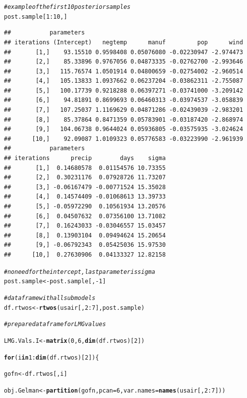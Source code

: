 \documentclass[11pt,a4paper,twoside]{book}
\makeatletter
\newcommand{\hlnum}[1]{\textcolor[rgb]{0.686,0.059,0.569}{#1}}%
\newcommand{\hlcom}[1]{\textcolor[rgb]{0.678,0.584,0.686}{\textit{#1}}}%
\newcommand{\hlopt}[1]{\textcolor[rgb]{0,0,0}{#1}}%
\newcommand{\hlstd}[1]{\textcolor[rgb]{0.345,0.345,0.345}{#1}}%
\newcommand{\hlkwa}[1]{\textcolor[rgb]{0.161,0.373,0.58}{\textbf{#1}}}%
\newcommand{\hlkwb}[1]{\textcolor[rgb]{0.69,0.353,0.396}{#1}}%
\newcommand{\hlkwc}[1]{\textcolor[rgb]{0.333,0.667,0.333}{#1}}%
\newcommand{\hlkwd}[1]{\textcolor[rgb]{0.737,0.353,0.396}{\textbf{#1}}}%
\newenvironment{kframe}{%
 \def\at@end@of@kframe{}%
 \ifinner\ifhmode%
  \def\at@end@of@kframe{\end{minipage}}%
  \begin{minipage}{\columnwidth}%
 \fi\fi%
 \def\FrameCommand##1{\hskip\@totalleftmargin \hskip-\fboxsep
 \colorbox{shadecolor}{##1}\hskip-\fboxsep
     \hskip-\linewidth \hskip-\@totalleftmargin \hskip\columnwidth}%
 \MakeFramed {\advance\hsize-\width
   \@totalleftmargin\z@ \linewidth\hsize
   \@setminipage}}%
 {\par\unskip\endMakeFramed%
 \at@end@of@kframe}
\newenvironment{knitrout}{}{} %
\makeatother
\begin{document}
\begin{knitrout}
\begin{kframe}
\begin{alltt}
\hlcom{#example of the first 10 posterior samples}
\hlstd{post.sample[}\hlnum{1}\hlopt{:}\hlnum{10}\hlstd{,]}
\end{alltt}
\begin{verbatim}
##           parameters
## iterations (Intercept)   negtemp      manuf         pop      wind
##       [1,]    93.15510 0.9598408 0.05076080 -0.02230947 -2.974473
##       [2,]    85.33896 0.9767056 0.04873335 -0.02762700 -2.993646
##       [3,]   115.76574 1.0501914 0.04800659 -0.02754002 -2.960514
##       [4,]   105.13833 1.0937662 0.06237204 -0.03862311 -2.755087
##       [5,]   100.17739 0.9218288 0.06397271 -0.03741000 -3.209142
##       [6,]    94.81891 0.8699693 0.06460313 -0.03974537 -3.058839
##       [7,]   107.25037 1.1169629 0.04871286 -0.02439039 -2.983201
##       [8,]    85.37864 0.8471359 0.05783901 -0.03187420 -2.868974
##       [9,]   104.06738 0.9644024 0.05936805 -0.03575935 -3.024624
##      [10,]    92.09087 1.0109323 0.05776583 -0.03223990 -2.961939
##           parameters
## iterations      precip        days    sigma
##       [1,]  0.14680578  0.01154576 10.73355
##       [2,]  0.30231176  0.07928726 11.73207
##       [3,] -0.06167479 -0.00771524 15.35028
##       [4,]  0.14574409 -0.01068613 13.39733
##       [5,] -0.05972290  0.10561934 13.20576
##       [6,]  0.04507632  0.07356100 13.71082
##       [7,]  0.16243033 -0.03046557 15.03457
##       [8,]  0.13903104  0.09494624 15.20654
##       [9,] -0.06792343  0.05425036 15.97530
##      [10,]  0.27630906  0.04133327 12.82158
\end{verbatim}
\begin{alltt}
\hlcom{#no need for the intercept, last parameter is sigma}
\hlstd{post.sample} \hlkwb{<-} \hlstd{post.sample[,}\hlopt{-}\hlnum{1}\hlstd{]}

\hlcom{#data frame with all submodels}
\hlstd{df.rtwos} \hlkwb{<-}\hlkwd{rtwos}\hlstd{(usair[,}\hlnum{2}\hlopt{:}\hlnum{7}\hlstd{], post.sample)}


\hlcom{# prepare data frame for LMG values}

\hlstd{LMG.Vals.I}\hlkwb{<-}\hlkwd{matrix}\hlstd{(}\hlnum{0}\hlstd{,} \hlnum{6}\hlstd{,} \hlkwd{dim}\hlstd{(df.rtwos)[}\hlnum{2}\hlstd{])}

\hlkwa{for}\hlstd{(i} \hlkwa{in} \hlnum{1}\hlopt{:}\hlkwd{dim}\hlstd{(df.rtwos)[}\hlnum{2}\hlstd{])\{}

  \hlstd{gofn}\hlkwb{<-}\hlstd{df.rtwos[,i]}

  \hlstd{obj.Gelman}\hlkwb{<-}\hlkwd{partition}\hlstd{(gofn,} \hlkwc{pcan} \hlstd{=} \hlnum{6}\hlstd{,} \hlkwc{var.names} \hlstd{=} \hlkwd{names}\hlstd{(usair[,}\hlnum{2}\hlopt{:}\hlnum{7}\hlstd{]))}


\end{alltt}
\end{kframe}
\end{knitrout}
\end{document}
